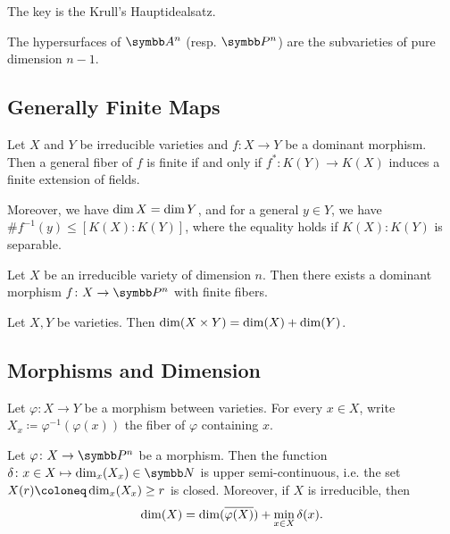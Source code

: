 The key is the Krull's Hauptidealsatz.

\begin{corollary}
    The hypersurfaces of $\AAA^n$ (resp. $\PP^n$) are the subvarieties of pure dimension $n-1$.
\end{corollary}

\subsection{Generally Finite Maps}

\begin{theorem}
  Let $X$ and $Y$ be irreducible varieties and $f\colon X\to Y$ be a dominant morphism. Then a general fiber of $f$ is finite if and only if $f^*\colon K(Y)\to K(X)$ induces a finite extension of fields.

  Moreover, we have $\operatorname{dim} X=\operatorname{dim} Y$, and for a general $y\in Y$, we have $\#f^{-1}(y)\leq [K(X):K(Y)]$, where the equality holds if $K(X):K(Y)$ is separable.
\end{theorem}

\begin{corollary}
    Let $X$ be an irreducible variety of dimension $n$. Then there exists a dominant morphism $f\colon X\to \PP^n$ with finite fibers.
\end{corollary}

\begin{corollary}
    Let $X, Y$ be varieties. Then $\operatorname{dim}(X\times Y)=\operatorname{dim}(X)+\operatorname{dim}(Y)$.
\end{corollary}

\subsection{Morphisms and Dimension}

Let $\varphi\colon X\to Y$ be a morphism between varieties. For every $x\in X$, write $X_x\coloneq \varphi^{-1}(\varphi(x))$ the fiber of $\varphi$ containing $x$.

\begin{theorem}
  Let $\varphi\colon X\to \PP^n$ be a morphism. Then the function $\delta\colon x\in X\mapsto \DIM_x (X_x)\in \NN$ is upper semi-continuous, i.e. the set $X(r)\coloneq \DIM_x (X_x)\geq r$ is closed. Moreover, if $X$ is irreducible, then
  \begin{equation*}
    \operatorname{dim} (X)=\operatorname{dim} (\overline{\varphi(X)}) + \operatorname*{min}_{x\in X}\delta(x).
  \end{equation*}
\end{theorem}

